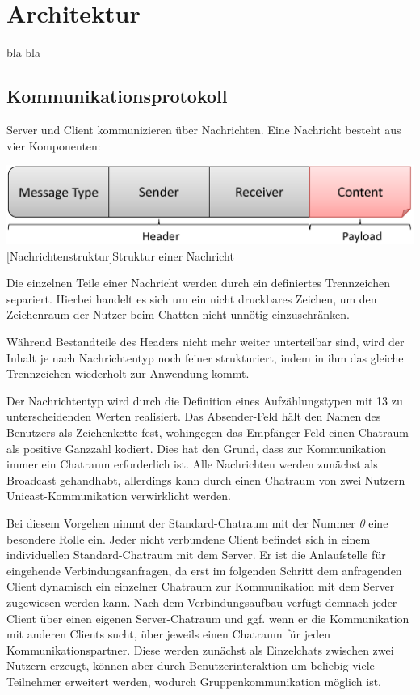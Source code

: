 \documentclass[12pt,a4paper,bibliography=totocnumbered,listof=totocnumbered]{scrartcl}
\begin{document}
\section{Architektur}
bla bla

\subsection{Kommunikationsprotokoll}
Server und Client kommunizieren über Nachrichten. Eine Nachricht besteht aus vier Komponenten:

\vspace{1em}
\begin{minipage}{\linewidth}
	\centering
	\includegraphics[width=0.7\linewidth]{img/Nachrichtenstruktur.png}
	[Nachrichtenstruktur]{Struktur einer Nachricht}
	\label{fig:Nachrichtenstruktur}
\end{minipage}
\vspace{0.5em}

Die einzelnen Teile einer Nachricht werden durch ein definiertes Trennzeichen separiert. Hierbei handelt es sich um ein nicht druckbares Zeichen, um den Zeichenraum der Nutzer beim Chatten nicht unnötig einzuschränken.

Während Bestandteile des Headers nicht mehr weiter unterteilbar sind, wird der Inhalt je nach Nachrichtentyp noch feiner strukturiert, indem in ihm das gleiche Trennzeichen wiederholt zur Anwendung kommt.

Der Nachrichtentyp wird durch die Definition eines Aufzählungstypen mit 13 zu unterscheidenden Werten realisiert. Das Absender-Feld hält den Namen des Benutzers als Zeichenkette fest, wohingegen das Empfänger-Feld einen Chatraum als positive Ganzzahl kodiert. Dies hat den Grund, dass zur Kommunikation immer ein Chatraum erforderlich ist. Alle Nachrichten werden zunächst als Broadcast gehandhabt, allerdings kann durch einen Chatraum von zwei Nutzern Unicast-Kommunikation verwirklicht werden. 

Bei diesem Vorgehen nimmt der Standard-Chatraum mit der Nummer \textit{0} eine besondere Rolle ein. Jeder nicht verbundene Client befindet sich in einem individuellen Standard-Chatraum mit dem Server. Er ist die Anlaufstelle für eingehende Verbindungsanfragen, da erst im folgenden Schritt dem anfragenden Client dynamisch ein einzelner Chatraum zur Kommunikation mit dem Server zugewiesen werden kann. Nach dem Verbindungsaufbau verfügt demnach jeder Client über einen eigenen Server-Chatraum und ggf. wenn er die Kommunikation mit anderen Clients sucht, über jeweils einen Chatraum für jeden Kommunikationspartner. Diese werden zunächst als Einzelchats zwischen zwei Nutzern erzeugt, können aber durch Benutzerinteraktion um beliebig viele Teilnehmer erweitert werden, wodurch Gruppenkommunikation möglich ist.
\end{document}
